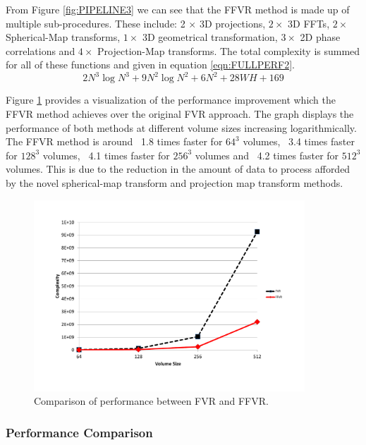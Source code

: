 From Figure \ref{fig:PIPELINE3} we can see that the FFVR method is made up of multiple sub-procedures. These include: 2 $\times$ 3D projections, $2 \times$ 3D FFTs, $2 \times$ Spherical-Map transforms, $1 \times$ 3D geometrical transformation, $3 \times$ 2D phase correlations and $4 \times$ Projection-Map transforms. The total complexity is summed for all of these functions and given in equation \ref{eqn:FULLPERF2}. \\

\begin{equation} \label{eqn:FULLPERF2}
2N^3\log{N^3} + 9N^2\log{N^2} + 6N^2 + 28WH + 169
\end{equation}

Figure \ref{fig:perfComp} provides a visualization of the performance improvement which the FFVR method achieves over the original FVR approach. The graph displays the performance of both methods at different volume sizes increasing logarithmically. The FFVR method is around ~1.8 times faster for $64^3$ volumes, ~3.4 times faster for $128^3$ volumes, ~4.1 times faster for $256^3$ volumes and ~4.2 times faster for $512^3$ volumes. This is due to the reduction in the amount of data to process afforded by the novel spherical-map transform and projection map transform methods.

\begin{figure}[!htb]
\centering
\includegraphics[width=4.0in]{images/methodology/FVR/performanceImprovement}
\caption{Comparison of performance between FVR and FFVR.}
\label{fig:perfComp}
\end{figure}

\subsubsection{Performance Comparison}

